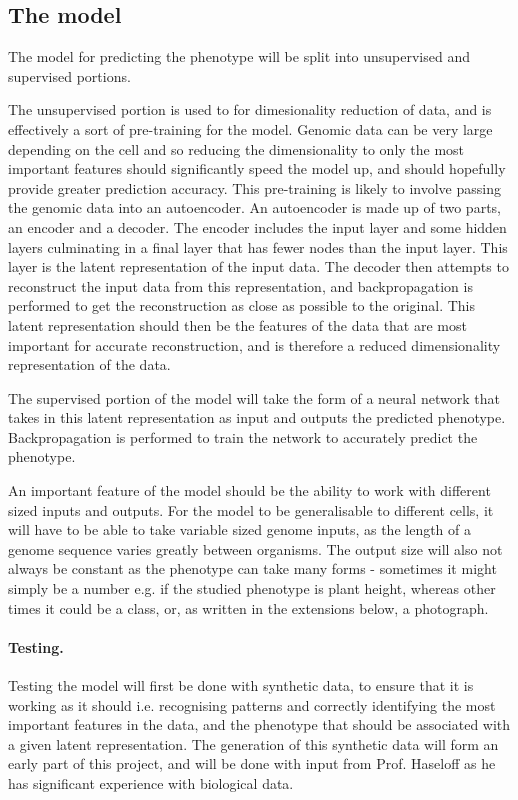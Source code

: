 \documentclass[12pt,a4paper,twoside,openany]{article}
\begin{document}
\subsection*{The model}

The model for predicting the phenotype will be split into unsupervised and supervised portions.

The unsupervised portion is used to for dimesionality reduction of data, and is effectively a sort of pre-training for the model. Genomic data can be very large depending on the cell and so reducing the dimensionality to only the most important features should significantly speed the model up, and should hopefully provide greater prediction accuracy. This pre-training is likely to involve passing the genomic data into an autoencoder. An autoencoder is made up of two parts, an encoder and a decoder. The encoder includes the input layer and some hidden layers culminating in a final layer that has fewer nodes than the input layer. This layer is the latent representation of the input data. The decoder then attempts to reconstruct the input data from this representation, and backpropagation is performed to get the reconstruction as close as possible to the original. This latent representation should then be the features of the data that are most important for accurate reconstruction, and is therefore a reduced dimensionality representation of the data.

The supervised portion of the model will take the form of a neural network that takes in this latent representation as input and outputs the predicted phenotype. Backpropagation is performed to train the network to accurately predict the phenotype.

An important feature of the model should be the ability to work with different sized inputs and outputs. For the model to be generalisable to different cells, it will have to be able to take variable sized genome inputs, as the length of a genome sequence varies greatly between organisms. The output size will also not always be constant as the phenotype can take many forms - sometimes it might simply be a number e.g. if the studied phenotype is plant height, whereas other times it could be a class, or, as written in the extensions below, a photograph.

\paragraph{Testing.}

Testing the model will first be done with synthetic data, to ensure that it is working as it should i.e. recognising patterns and correctly identifying the most important features in the data, and the phenotype that should be associated with a given latent representation. The generation of this synthetic data will form an early part of this project, and will be done with input from Prof. Haseloff as he has significant experience with biological data.  
\end{document}
